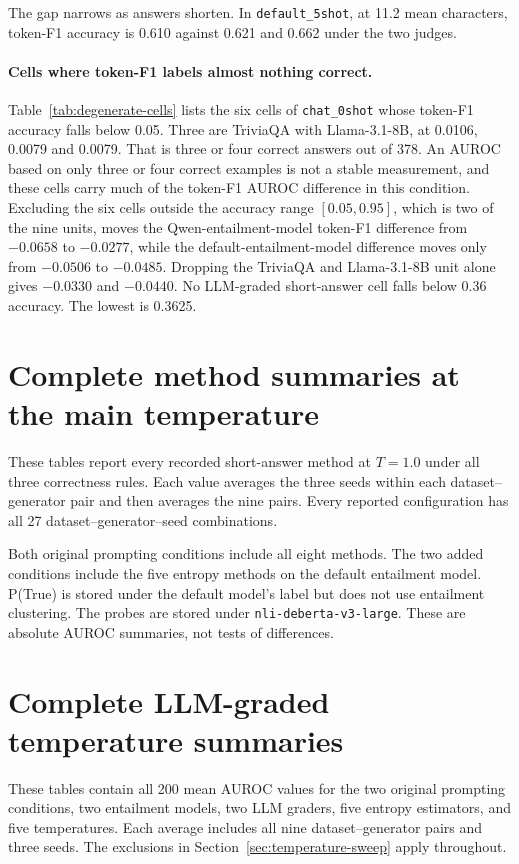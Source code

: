 

The gap narrows as answers shorten. In \texttt{default\_5shot}, at 11.2 mean
characters, token-F1 accuracy is 0.610 against 0.621 and 0.662 under the two
judges.

\paragraph{Cells where token-F1 labels almost nothing correct.}
Table~\ref{tab:degenerate-cells} lists the six cells of \texttt{chat\_0shot}
whose token-F1 accuracy falls below 0.05. Three are TriviaQA with
Llama-3.1-8B, at 0.0106, 0.0079 and 0.0079. That is three or four correct
answers out of 378. An AUROC based on only three or four correct examples is not a stable
measurement, and these cells carry much of the token-F1 AUROC difference in this
condition. Excluding the six cells outside the accuracy range $[0.05, 0.95]$,
which is two of the nine units, moves the Qwen-entailment-model token-F1 difference from
$-0.0658$ to $-0.0277$, while the default-entailment-model difference moves only from
$-0.0506$ to $-0.0485$. Dropping the TriviaQA and Llama-3.1-8B unit alone gives
$-0.0330$ and $-0.0440$. No LLM-graded short-answer cell falls below 0.36
accuracy. The lowest is 0.3625.



\FloatBarrier
\section{Complete method summaries at the main temperature}
\label{app:complete-method-results}

These tables report every recorded short-answer method at $T=1.0$ under all
three correctness rules. Each value averages the three seeds within each
dataset--generator pair and then averages the nine pairs. Every reported
configuration has all 27 dataset--generator--seed combinations.

Both original prompting conditions include all eight methods. The two added
conditions include the five entropy methods on the default entailment model.
P(True) is stored under the default model's label but does not use entailment
clustering. The probes are stored under \texttt{nli-deberta-v3-large}.
These are absolute AUROC summaries, not tests of differences.



\FloatBarrier
\section{Complete LLM-graded temperature summaries}
\label{app:complete-temperature-results}

These tables contain all 200 mean AUROC values for the two original prompting
conditions, two entailment models, two LLM graders, five entropy estimators,
and five temperatures. Each average includes all nine dataset--generator pairs
and three seeds. The exclusions in Section~\ref{sec:temperature-sweep} apply
throughout.


